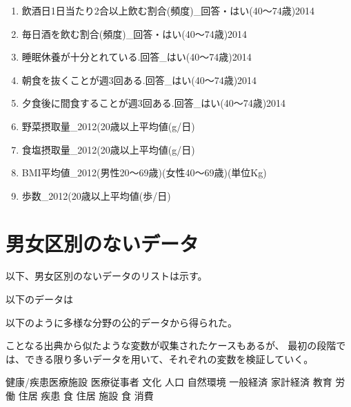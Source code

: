 \begin{multicols}{2}
\begin{enumerate}
  \item 飲酒日1日当たり2合以上飲む割合(頻度)\_回答・はい(40〜74歳)2014
  \item 毎日酒を飲む割合(頻度)\_回答・はい(40〜74歳)2014
  \item 睡眠休養が十分とれている.回答\_はい(40〜74歳)2014
  \item 朝食を抜くことが週3回ある.回答\_はい(40〜74歳)2014
  \item 夕食後に間食することが週3回ある.回答\_はい(40〜74歳)2014
  \item 野菜摂取量\_2012(20歳以上平均値(g/日)
  \item 食塩摂取量\_2012(20歳以上平均値(g/日)
  \item BMI平均値\_2012(男性20〜69歳)(女性40〜69歳)(単位Kg)
  \item 歩数\_2012(20歳以上平均値(歩/日)
\end{enumerate}


\end{multicols}




\newpage

\section{男女区別のないデータ}





以下、男女区別のないデータのリストは示す。

以下のデータは


以下のように多様な分野の公的データから得られた。

ことなる出典から似たような変数が収集されたケースもあるが、
最初の段階では、できる限り多いデータを用いて、それぞれの変数を検証していく。



健康/疾患医療施設
医療従事者
文化
人口
自然環境
一般経済
家計経済
教育
労働
住居
疾患
食
住居
施設
食
消費









